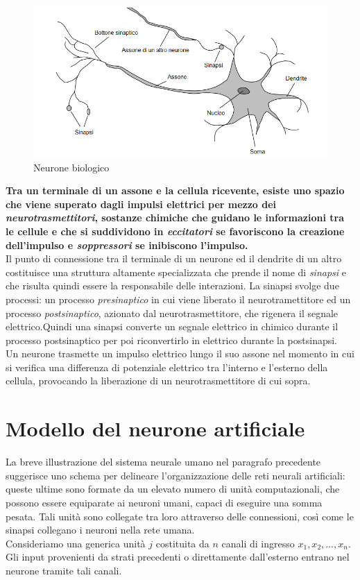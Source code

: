 \documentclass[12pt,a4paper,oneside]{book}
\begin{document}
		 \begin{figure}[h]
		 	\centering
		 	\includegraphics[width=1\linewidth]{IMMAGINI/neuron}
		 	\caption{Neurone biologico}
		 	\label{fig:neuron}
		 \end{figure}
	 
	 	\textbf{Tra un terminale di un assone e la cellula ricevente, esiste uno spazio che viene superato dagli impulsi elettrici per mezzo dei \emph{neurotrasmettitori}, sostanze chimiche che guidano le informazioni tra le cellule e che si suddividono in \emph{eccitatori} se favoriscono la creazione dell'impulso e \emph{soppressori} se inibiscono l'impulso.}\\ Il punto di connessione tra il terminale di un neurone ed il dendrite di un altro costituisce una struttura altamente specializzata che prende il nome di \emph{sinapsi} e che risulta quindi essere la responsabile delle interazioni. La sinapsi svolge due processi: un processo \emph{presinaptico} in cui viene liberato il neurotramettitore ed un processo \emph{postsinaptico}, azionato dal neurotrasmettitore, che rigenera il segnale elettrico.Quindi una sinapsi converte un segnale elettrico in chimico durante il processo postsinaptico per poi riconvertirlo in elettrico durante la postsinapsi.\\ 
	 	Un neurone trasmette un impulso elettrico lungo il suo assone nel momento in cui si verifica una differenza di potenziale elettrico tra l’interno e l’esterno della cellula, provocando la liberazione di un neurotrasmettitore di cui sopra.
		
		
		 
	\section{Modello del neurone artificiale}
		
		La breve illustrazione del sistema neurale umano nel paragrafo precedente suggerisce uno schema per delineare l'organizzazione delle reti neurali artificiali: queste ultime sono formate da un elevato numero di unità computazionali, che possono essere equiparate ai neuroni umani, capaci di eseguire una somma pesata. Tali unità sono collegate tra loro attraverso delle connessioni, così come le sinapsi collegano i neuroni nella rete umana. \\
		Consideriamo una generica unità $j$ costituita da $n$ canali di ingresso $x_{1}, x_{2}, ... ,x_{n}$.
		Gli input provenienti da strati precedenti o direttamente dall'esterno entrano nel neurone tramite tali canali.
\end{document}

